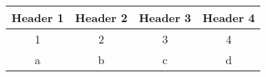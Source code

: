 \begin{tabular}{|c|c|c|c|}
\hline
Header 1 & Header 2 & Header 3 & Header 4 \\
\hline
1 & 2 & 3 & 4 \\
\hline
a & b & c & d \\
\hline
\end{tabular}